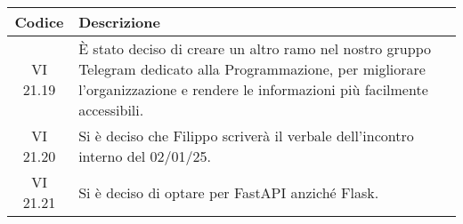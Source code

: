 \clearpage
\vspace*{-2cm} 
\begin{table}[t]
    \centering
    \begin{tabular}{|c|p{}|}
        \hline
        \rowcolor[gray]{0.75}
        \textbf{Codice} & \textbf{Descrizione}\\
        \hline    
        VI 21.19 & È stato deciso di creare un altro ramo nel nostro gruppo Telegram dedicato alla Programmazione, per migliorare l'organizzazione e rendere le informazioni più facilmente accessibili.\\
        \hline 
        VI 21.20 & Si è deciso che Filippo scriverà il verbale dell'incontro interno del 02/01/25. \\
        \hline
        VI 21.21 & Si è deciso di optare per FastAPI anziché Flask. \\
        \hline
    \end{tabular}
\end{table}

\clearpage
